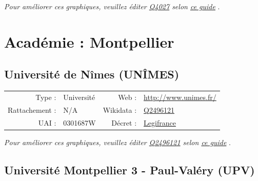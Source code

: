 \documentclass[12pt,french,landscape]{article}
\begin{document}
\textit{\scriptsize Pour améliorer ces graphiques, veuillez éditer \href{https://www.wikidata.org/entity/Q4027}{Q4027}  selon \href{https://github.com/cpesr/wikidataESR/blob/master/Rmd/wikidataESR.md}{ce guide}}
.


\newpage

\hypertarget{acaduxe9mie-montpellier}{%
\section{Académie : Montpellier}\label{acaduxe9mie-montpellier}}

\hypertarget{universituxe9-de-nuxeemes-unuxeemes}{%
\subsection{Université de Nîmes
(UNÎMES)}\label{universituxe9-de-nuxeemes-unuxeemes}}

\begin{tabular*}{0.45\textwidth}{rp{2cm}rl}  
\hline  
Type : & Université & Web : &\href{http://www.unimes.fr/}{http://www.unimes.fr/} \\  
Rattachement : & N/A & Wikidata : & \href{https://www.wikidata.org/entity/Q2496121}{Q2496121} \\  
UAI : & 0301687W & Décret : & \href{http://www.legifrance.gouv.fr/affichTexte.do;jsessionid=3976DDB631865D070704985BB39F3EC7.tpdjo05v_1?cidTexte=JORFTEXT000025790064&categorieLien=id}{Legifrance} \\  
\hline  
\end{tabular*}

\textit{\scriptsize Pour améliorer ces graphiques, veuillez éditer \href{https://www.wikidata.org/entity/Q2496121}{Q2496121}  selon \href{https://github.com/cpesr/wikidataESR/blob/master/Rmd/wikidataESR.md}{ce guide}}
.


\newpage

\hypertarget{universituxe9-montpellier-3---paul-valuxe9ry-upv}{%
\subsection{Université Montpellier 3 - Paul-Valéry
(UPV)}\label{universituxe9-montpellier-3---paul-valuxe9ry-upv}}
\end{document}

